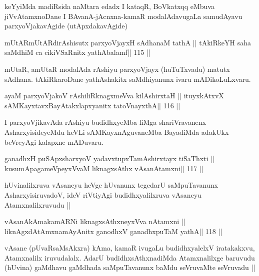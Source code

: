 \begin{artha}
keYyiMda madiRsida naMtara edadx I kataqR, BoVkatxqq eMbuva
jiVvAtamxnoDane I BAvanA-jAcnxna-kamaR modalAdavugaLa samudAyavu
parxyoVjakavAgide (utApxdakavAgide)
\end{artha}

\begin{shl}
mUtARmUtARdirAshisutx parxyoVjayxH sAdhanaM tathA ||
tAkiRkeYH saha saMdhiM ca cikiVSaRnitx yathAbalamf\hfill || 115 ||
\end{shl}

\begin{artha}
mUtaR, amUtaR modalAda rAshiyu parxyoVjayx (huTuTxvadu) matutx sAdhana.
tAkiRkaroDane yathAshakitx saMdhiyanunx ivaru mADikoLuLxvaru. 
\end{artha}

\begin{shl}
ayaM parxyoVjakoV rAshiliRknagxmeVva kilA\s\s shirxtaH ||
ituyxkAtxvX sAMKayxtavxBayAtakxlapxyanitx tatoV\s nayxthA\hfill || 116 ||
\end{shl}

\begin{artha}
I parxyoVjikavAda rAshiyu budidhxyeMba liMga shariVravanenx
AsharxyisideyeMdu heVLi sAMKayxnAguvaneMba BayadiMda adakUkx beVreyAgi
kalapxne mADuvaru.
\end{artha}



\begin{shl}
ganadhxH puSApxsharxyoV yadavxtupxTamAshirxtayx tiSaThxti ||
kusumApagameV\s peyxVvaM liknagxsAthx vAsanA\s\s tamxni\hfill || 117 ||
\end{shl}

\begin{artha}
hUvinalilxruva vAsaneyu heVge hUvanunx tegedarU saMpuTavanunx 
AsharxyisiruvadoV, ideV riVtiyAgi budidhxyalilxruva vAsaneyu Atamxnalilxruvudu ||
\end{artha}

\begin{shl}
vAsanAkAmakamARNi liknagxsAthxneyxVva nA\s\s tamxni ||
liknAgxdAtAmxnamAyAnitx ganodhxV ganadhxpuTaM yathA\hfill || 118 ||
\end{shl}

\begin{artha}
vAsane (pUvaRsaMsAkxra) kAma, kamaR ivugaLu budidhxyalelxV
iratakakxvu, Atamxnalilx iruvudalalx. AdarU budidhxsAthxnadiMda
Atamxnalilxge baruvudu (hUvina) gaMdhavu gaMdhada saMpuTavanunx baMdu
seVruvaMte seVruvadu ||
\end{artha}

